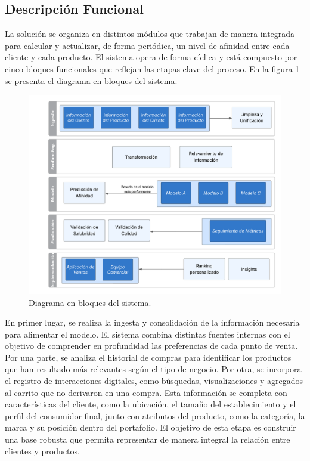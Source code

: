 \documentclass[
11pt, %
]{charter}
\begin{document}
\subsection{Descripción Funcional}

La solución se organiza en distintos módulos que trabajan de manera integrada para calcular y actualizar, de forma periódica, un nivel de afinidad entre cada cliente y cada producto. El sistema opera de forma cíclica y está compuesto por cinco bloques funcionales que reflejan las etapas clave del proceso. En la figura \ref{fig:diagBloques} se presenta el diagrama en bloques del sistema. 

\begin{figure}[htpb]
\centering 
\includegraphics[width=.85\textwidth]{./Figuras/diagBloques.png}
\caption{Diagrama en bloques del sistema.}
\label{fig:diagBloques}
\end{figure}

En primer lugar, se realiza la ingesta y consolidación de la información necesaria para alimentar el modelo. El sistema combina distintas fuentes internas con el objetivo de comprender en profundidad las preferencias de cada punto de venta. Por una parte, se analiza el historial de compras para identificar los productos que han resultado más relevantes según el tipo de negocio. Por otra, se incorpora el registro de interacciones digitales, como búsquedas, visualizaciones y agregados al carrito que no derivaron en una compra. Esta información se completa con características del cliente, como la ubicación, el tamaño del establecimiento y el perfil del consumidor final, junto con atributos del producto, como la categoría, la marca y su posición dentro del portafolio. El objetivo de esta etapa es construir una base robusta que permita representar de manera integral la relación entre clientes y productos.
\end{document}
